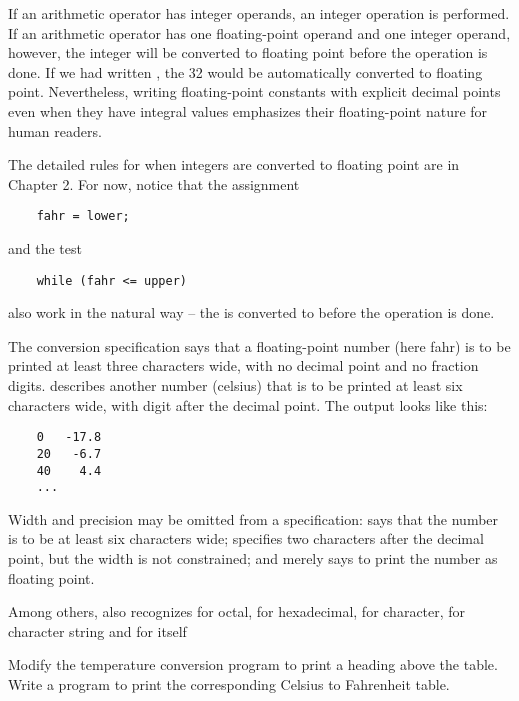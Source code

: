 If an arithmetic operator has integer operands, an integer operation is performed.
If an arithmetic operator has one floating-point operand and one integer operand, however, the integer will be converted to floating point before the operation is done.
If we had written , the 32 would be automatically converted to floating point.
Nevertheless, writing floating-point constants with explicit decimal points even when they have integral values emphasizes their floating-point nature for human readers.

The detailed rules for when integers are converted to floating point are in Chapter 2.
For now, notice that the assignment
\begin{lstlisting}
	fahr = lower;
\end{lstlisting}
and the test
\begin{lstlisting}
	while (fahr <= upper)
\end{lstlisting}
also work in the natural way -- the  is converted to  before the operation is done.

The  conversion specification  says that a floating-point number (here fahr) is to be printed at least three characters wide, with no decimal point and no fraction digits.
 describes another number (celsius) that is to be printed at least six characters wide, with  digit after the decimal point.
The output looks like this:

\begin{lstlisting}
	0 	-17.8
	20 	 -6.7
	40 	  4.4
	...
\end{lstlisting}

Width and precision may be omitted from a specification:
 says that the number is to be at least six characters wide;  specifies two characters after the decimal point, but the width is not constrained; and  merely says to print the number as floating point.

Among others,  also recognizes  for octal,  for hexadecimal,  for character,  for character string and \code{\%\%} for itself
\newline

\begin{ExerciseList}
\Exercise Modify the temperature conversion program to print a heading above the table.
\Exercise Write a program to print the corresponding Celsius to Fahrenheit table.
\end{ExerciseList}



